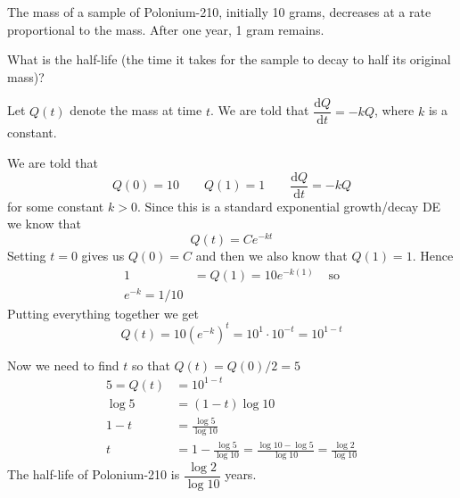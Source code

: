 \documentclass[12pt]{exam}
\renewcommand{\questionlabel}{Q\thequestion.}
\newcommand{\blank}{
  \ifprintanswers{}\else{\vfill}\fi
}
\newcommand{\dee}[1]{{\mathrm{d}#1}}
\newcommand{\diff}[2]{\dfrac{\dee{#1}}{\dee{#2}}}
\begin{document}
\begin{questions}

	\newpage
	\renewcommand{\questionlabel}{DiffEq}
	\question[7] The mass of a sample of Polonium-210, initially 10 grams, decreases at a rate proportional to the mass. After one year, 1 gram remains.

	What is the half-life (the time it takes for the sample to decay to half its original mass)?
	\begin{solution}
		Let \(Q(t)\) denote the mass at time \(t\). We are told that $\diff{Q}{t}=-kQ$, where $k$ is a constant.

		We are told that
		\[
			Q(0)=10 \qquad Q(1)=1 \qquad \diff{Q}{t}=-kQ
		\]
		for some constant \(k>0\). Since this is a standard exponential growth/decay DE we know that
		\[
			Q(t) = C e^{-kt}
		\]
		Setting \(t=0\) gives us  \(Q(0)=C\) and then we also know that \(Q(1)=1\). Hence
		\begin{align*}
			1 & =Q(1)=10 e^{-k(1)} & \text{ so} \\
			e^{-k}=1/10
		\end{align*}
		Putting everything together we get
		\[
			Q(t)=10(e^{-k})^t = 10^1 \cdot 10^{-t} = 10^{1-t}
		\]

		Now we need to find \(t\) so that \(Q(t)=Q(0)/2 = 5 \)
		\begin{align*}
			5=Q(t) & =10^{1-t}                                                                                \\
			\log 5 & =(1-t)\log 10                                                                            \\
			1-t    & = \frac{\log 5}{\log 10}                                                                 \\
			t      & = 1 - \frac{\log 5}{\log 10} = \frac{\log 10 - \log 5}{\log 10} = \frac{\log 2}{\log 10}
		\end{align*}
		The half-life of Polonium-210 is $\dfrac{\log 2}{\log 10}$ years.


\end{solution}
\end{questions}
\end{document}
